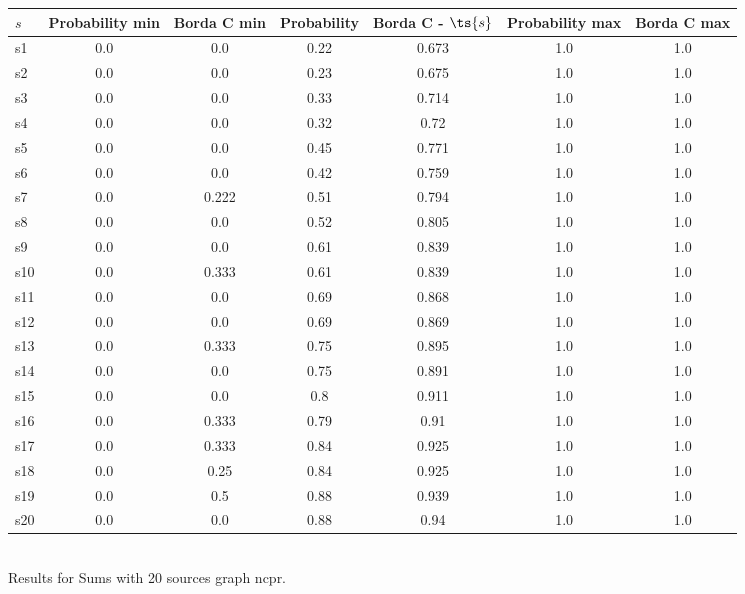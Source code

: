 \documentclass{article}
\begin{document}
\noindent\begin{tabular}{|l|c|c|c|c|c|c|}
\hline
$s$& Probability min & Borda C min & Probability & Borda C - $\ts{s}$ & Probability max & Borda C max\\
\hline
s1 &0.0 & 0.0 & 0.22 & 0.673 & 1.0 & 1.0\\
\hline
s2 &0.0 & 0.0 & 0.23 & 0.675 & 1.0 & 1.0\\
\hline
s3 &0.0 & 0.0 & 0.33 & 0.714 & 1.0 & 1.0\\
\hline
s4 &0.0 & 0.0 & 0.32 & 0.72 & 1.0 & 1.0\\
\hline
s5 &0.0 & 0.0 & 0.45 & 0.771 & 1.0 & 1.0\\
\hline
s6 &0.0 & 0.0 & 0.42 & 0.759 & 1.0 & 1.0\\
\hline
s7 &0.0 & 0.222 & 0.51 & 0.794 & 1.0 & 1.0\\
\hline
s8 &0.0 & 0.0 & 0.52 & 0.805 & 1.0 & 1.0\\
\hline
s9 &0.0 & 0.0 & 0.61 & 0.839 & 1.0 & 1.0\\
\hline
s10 &0.0 & 0.333 & 0.61 & 0.839 & 1.0 & 1.0\\
\hline
s11 &0.0 & 0.0 & 0.69 & 0.868 & 1.0 & 1.0\\
\hline
s12 &0.0 & 0.0 & 0.69 & 0.869 & 1.0 & 1.0\\
\hline
s13 &0.0 & 0.333 & 0.75 & 0.895 & 1.0 & 1.0\\
\hline
s14 &0.0 & 0.0 & 0.75 & 0.891 & 1.0 & 1.0\\
\hline
s15 &0.0 & 0.0 & 0.8 & 0.911 & 1.0 & 1.0\\
\hline
s16 &0.0 & 0.333 & 0.79 & 0.91 & 1.0 & 1.0\\
\hline
s17 &0.0 & 0.333 & 0.84 & 0.925 & 1.0 & 1.0\\
\hline
s18 &0.0 & 0.25 & 0.84 & 0.925 & 1.0 & 1.0\\
\hline
s19 &0.0 & 0.5 & 0.88 & 0.939 & 1.0 & 1.0\\
\hline
s20 &0.0 & 0.0 & 0.88 & 0.94 & 1.0 & 1.0\\
\hline
\end{tabular}\\

\noindent Results for Sums with 20 sources graph ncpr.
\end{document}
